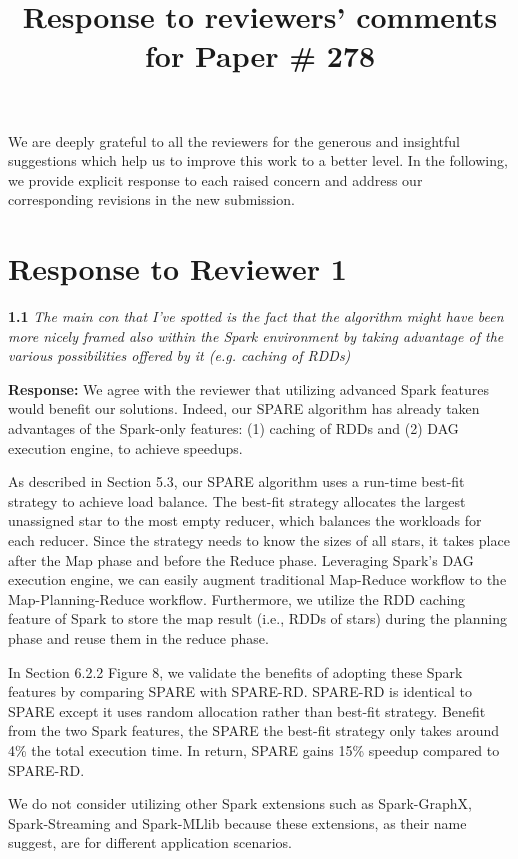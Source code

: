 \documentclass{vldb}
\begin{document}
\title{Response to reviewers' comments for Paper \# 278}
\maketitle

We are deeply grateful to all the reviewers for the generous and insightful
suggestions which help us to improve this work to a better level.
In the following, we provide explicit response to each raised concern and address our corresponding revisions in the new submission.

\section{Response to Reviewer 1}

\textbf{1.1} \emph{The main con that I've spotted is the fact that the algorithm might have been
more nicely framed also within the Spark environment by taking advantage of
the various possibilities offered by it (e.g. caching of RDDs)}


\textbf{Response:} We agree with the reviewer that utilizing advanced Spark features
would benefit our solutions. Indeed, our SPARE algorithm has already taken advantages of the Spark-only features: (1) caching of RDDs and (2) DAG execution engine, to achieve speedups.

As described in Section 5.3, our SPARE algorithm uses a run-time best-fit strategy to achieve load balance. The best-fit strategy allocates the largest unassigned star to the most empty reducer, which balances the workloads for each reducer. Since the strategy needs to know the sizes of all stars, it takes place after the Map phase and before the Reduce phase.
Leveraging Spark's DAG execution engine, we can easily augment traditional Map-Reduce workflow to the Map-Planning-Reduce workflow. Furthermore, we utilize the RDD caching feature of Spark to store the map result (i.e., RDDs of stars)
during the planning phase and reuse them in the reduce phase.

In Section 6.2.2 Figure 8, we validate the benefits of adopting these Spark features by comparing SPARE with
SPARE-RD. SPARE-RD is identical to SPARE except it uses random allocation rather than best-fit strategy. Benefit from the two Spark features, the SPARE the best-fit strategy
 only takes around 4\% the total execution time. In return, SPARE gains 15\% speedup compared to SPARE-RD.


We do not consider utilizing other Spark extensions such as Spark-GraphX, Spark-Streaming and Spark-MLlib because these extensions, as their name suggest, are for different application scenarios.









\end{document}

